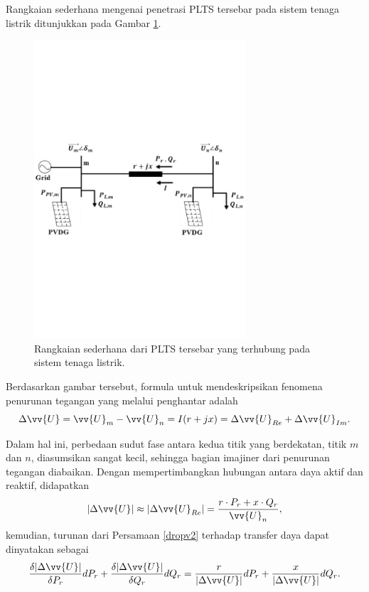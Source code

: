 {Rangkaian sederhana mengenai penetrasi PLTS tersebar pada sistem tenaga listrik ditunjukkan pada Gambar \ref{voltagerise}.
\begin{figure}[!h]
	\centering
	\includegraphics[width=0.7\textwidth]{Fig/voltagerise}
	\caption{Rangkaian sederhana dari PLTS tersebar yang terhubung pada sistem tenaga listrik.}
	\label{voltagerise}
\end{figure}
Berdasarkan gambar tersebut, formula untuk mendeskripsikan fenomena penurunan tegangan yang melalui penghantar adalah
\begin{equation}\label{dropv1}
\Delta\vv{U}=\vv{U}_m-\vv{U}_n=I(r+jx)=\Delta\vv{U}_{Re}+\Delta\vv{U}_{Im}.
\end{equation}

Dalam hal ini, perbedaan sudut fase antara kedua titik yang berdekatan, titik $m$ dan $n$, diasumsikan sangat kecil, sehingga bagian imajiner dari penurunan tegangan diabaikan. Dengan mempertimbangkan hubungan antara daya aktif dan reaktif, didapatkan
\begin{equation}\label{dropv2}
	|\Delta\vv{U}|\approx|\Delta\vv{U}_{Re}|=\dfrac{r\cdot P_r+x\cdot Q_r}{\vv{U}_n},
\end{equation}
kemudian, turunan dari Persamaan \ref{dropv2} terhadap transfer daya dapat dinyatakan sebagai
\begin{equation}\label{vrise1}
	\dfrac{\delta|\Delta\vv{U}|}{\delta P_r}dP_r+\dfrac{\delta|\Delta\vv{U}|}{\delta Q_r}dQ_r=\dfrac{r}{|\Delta\vv{U}|}dP_r+\dfrac{x}{|\Delta\vv{U}|}dQ_r.
\end{equation}

}

